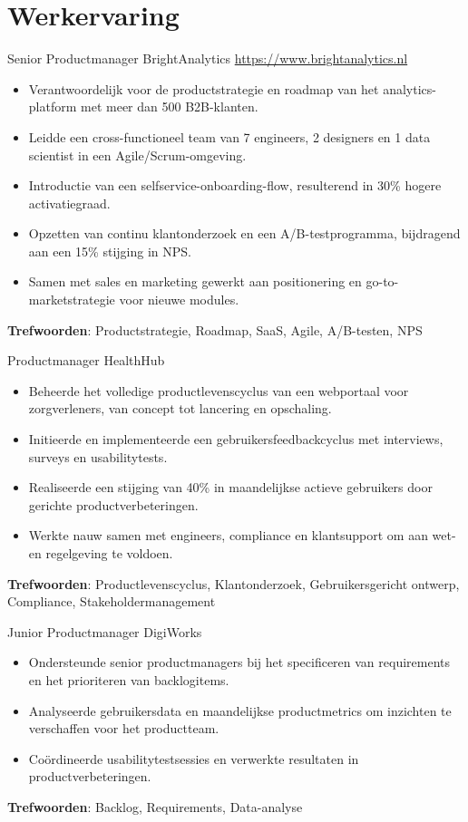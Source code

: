 \documentclass[a4paper, serif, 10pt]{moderncv}
\begin{document}
\section{Werkervaring}

        {Senior Productmanager}
        {BrightAnalytics}
        {\url{https://www.brightanalytics.nl}}
        {}
        {\begin{itemize}
\item Verantwoordelijk voor de productstrategie en roadmap van het analytics-platform met meer dan 500 B2B-klanten.
\item Leidde een cross-functioneel team van 7 engineers, 2 designers en 1 data scientist in een Agile/Scrum-omgeving.
\item Introductie van een selfservice-onboarding-flow, resulterend in 30\% hogere activatiegraad.
\item Opzetten van continu klantonderzoek en een A/B-testprogramma, bijdragend aan een 15\% stijging in NPS.
\item Samen met sales en marketing gewerkt aan positionering en go-to-marketstrategie voor nieuwe modules.
\end{itemize}
\textbf{Trefwoorden}: Productstrategie, Roadmap, SaaS, Agile, A/B-testen, NPS}

        {Productmanager}
        {HealthHub}
        {}
        {}
        {\begin{itemize}
\item Beheerde het volledige productlevenscyclus van een webportaal voor zorgverleners, van concept tot lancering en opschaling.
\item Initieerde en implementeerde een gebruikersfeedbackcyclus met interviews, surveys en usabilitytests.
\item Realiseerde een stijging van 40\% in maandelijkse actieve gebruikers door gerichte productverbeteringen.
\item Werkte nauw samen met engineers, compliance en klantsupport om aan wet- en regelgeving te voldoen.
\end{itemize}
\textbf{Trefwoorden}: Productlevenscyclus, Klantonderzoek, Gebruikersgericht ontwerp, Compliance, Stakeholdermanagement}

        {Junior Productmanager}
        {DigiWorks}
        {}
        {}
        {\begin{itemize}
\item Ondersteunde senior productmanagers bij het specificeren van requirements en het prioriteren van backlogitems.
\item Analyseerde gebruikersdata en maandelijkse productmetrics om inzichten te verschaffen voor het productteam.
\item Coördineerde usabilitytestsessies en verwerkte resultaten in productverbeteringen.
\end{itemize}
\textbf{Trefwoorden}: Backlog, Requirements, Data-analyse}
\end{document}
